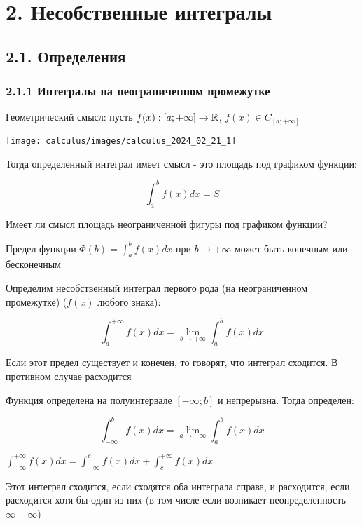 \documentclass[12pt]{article}
\begin{document}
    \clearpage

    \section{2. Несобственные интегралы}

    \subsection{2.1. Определения}

    \subsubsection{2.1.1 Интегралы на неограниченном промежутке}

    Геометрический смысл: пусть $f(x) : [a; +\infty] \to \mathbb{R}$, $f(x) \in C_{[a; +\infty]}$

    \texttt{[image: calculus/images/calculus\_2024\_02\_21\_1]}

    Тогда определенный интеграл имеет смысл - это площадь под графиком функции:

    \[\int^{b}_{a} f(x) dx = S\]

    Имеет ли смысл площадь неограниченной фигуры под графиком функции?

    Предел функции $\Phi (b) = \int^{b}_{a} f(x) dx$ при $b \to +\infty$ может быть конечным или бесконечным

     \hypertarget{improperintegralfirstkind}{Определим несобственный интеграл первого рода} (на неограниченном промежутке) ($f(x)$ любого знака):

    \[\int^{+\infty}_{a} f(x) dx = \lim_{b \to +\infty} \int^{b}_{a} f(x) dx\]

    \Nota Если этот предел существует и конечен, то говорят, что интеграл сходится. В противном случае расходится

     Функция определена на полуинтервале $[-\infty; b]$ и непрерывна. Тогда определен:

    \[\int^{b}_{-\infty} f(x) dx = \lim_{a \to -\infty} \int^{b}_{a} f(x) dx\]

     $\displaystyle \int^{+\infty}_{-\infty} f(x) dx = \int^{c}_{-\infty} f(x) dx + \int^{+\infty}_{c} f(x) dx$

    \Nota Этот интеграл сходится, если сходятся оба интеграла справа, и расходится, если расходится хотя бы один из них
    (в том числе если возникает неопределенность $\infty - \infty$)
\end{document}
